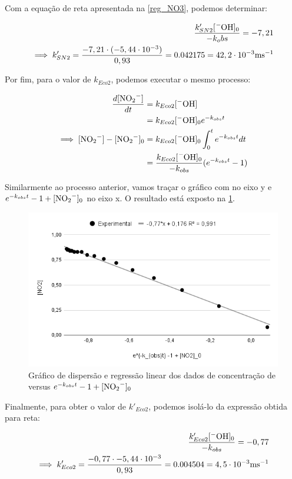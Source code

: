 Com a equação de reta apresentada na \cref{reg_NO3}, podemos determinar:

\begin{align*}
    \frac{k'_{SN2} [\ce{^-OH}]_0}{-k_obs} = -7,21\\
    \implies k'_{SN2} = \frac{-7,21 \cdot (-5,44 \cdot 10^{-3})}{0,93} = 0.042175 = 42,2 \cdot 10^{-3} \si{\per \milli \second}
\end{align*}

Por fim, para o valor de \(k_{Eco2}\), podemos executar o mesmo processo:

\begin{align*}
    \frac{d[\ce{NO2^-}]}{dt} &= k_{Eco2} [^-\ce{OH}] \\
                             &= k_{Eco2} [^- \ce{OH}]_0 e^{-k_{obs}t}\\
    \implies [\ce{NO2^-}] - [\ce{NO2^-}]_0 &= k_{Eco2} [\ce{^-OH}]_0 \int_{0}^t e^{-k_{obs}t} dt\\
                                           &= \frac{k_{Eco2} [\ce{^-OH}]_0}{-k_{obs}}  (e^{-k_{obs} t} - 1)
\end{align*}

Similarmente ao processo anterior, vamos traçar o gráfico com \ce{[NO2^-]} no eixo y e \(e^{-k_{obs} t} - 1 + \ce{[NO2^-]_0}\) no eixo x. O resultado está exposto na \cref{reg_NO2}.

\begin{figure}[H]
    \centering
    \includegraphics[width=.5\linewidth]{fig/linReg_NO2}
    \caption{Gráfico de dispersão e regressão linear dos dados de concentração de  versus \(e^{-k_{obs}t} -1 + [\ce{NO2^-]_0}\)}\label{reg_NO2}
\end{figure}


Finalmente, para obter o valor de \(k'_{Eco2}\), podemos isolá-lo da expressão obtida para reta:

\begin{align*}
    \frac{k'_{Eco2} [^-\ce{OH}]_0}{-k_{obs}} = -0,77 \\
    \implies k'_{Eco2} = \frac{-0,77 \cdot -5,44 \cdot 10^{-3}}{0,93} = 0.004504 = 4,5 \cdot 10^{-3} \si{\per \milli \second} 
\end{align*}

